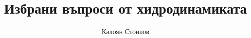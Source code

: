 \documentclass[bulgarian, 12pt]{article}
\title{Избрани въпроси от хидродинамиката}
\author{Калоян Стоилов}
\begin{document}
\nocite{*}

\maketitle



%


\end{document}
